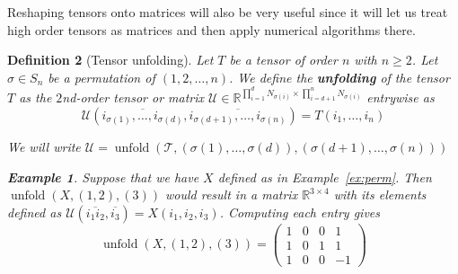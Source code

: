 \documentclass[11pt,a4paper,openright,oneside]{book}
\numberwithin{equation}{section}
\newtheorem{defn0}{Definition}[chapter]
\newtheorem{example0}[defn0]{Example}
\newenvironment{definition}{ \begin{defn0}}{\end{defn0}}
\newenvironment{example}{ \begin{example0}\rm}{\end{example0}}
\newcommand{\exref}[1]{Example~\ref{#1}}
\DeclareMathOperator{\unfolding}{unfold}
\begin{document}
Reshaping tensors onto matrices will also be very useful since it will let us treat high order tensors as matrices and then apply numerical algorithms
there.

\begin{definition}[Tensor unfolding]
Let $T$ be a tensor of order $n$ with $n \geqslant 2$. Let $\sigma \in S_n$ be a permutation of $(1,2,\dots, n)$. We define the
\textbf{unfolding} of the tensor $T$ as the $2$nd-order tensor or matrix 
$\mathcal{U} \in \mathbb{R}^{\prod_{i=1}^d N_{\sigma(i)} \times \prod_{i=d+1}^n N_{\sigma(i)}}$ entrywise as
$$ \mathcal{U} (\overline{i_{\sigma(1)}, \dots, i_{\sigma(d)}}, \overline{i_{\sigma(d+1)}, \dots, i_{\sigma(n)}}) = T(i_1, \dots, i_n)$$

We will write $\mathcal{U} = \unfolding{(\mathcal{T}, (\sigma(1), \dots, \sigma(d)), (\sigma(d+1), \dots, \sigma(n)))}$ 

\begin{example}
    Suppose that we have $X$ defined as in \exref{ex:perm}.
        Then $\unfolding{(X, (1, 2), (3))}$ would result in a matrix $\mathbb{R}^{3 \times 4}$ with its elements defined as 
        $\mathcal{U}(\overline{i_1  i_2}, \overline{i_3}) = X(i_1, i_2, i_3)$. Computing each entry gives
        $$\unfolding{(X, (1, 2), (3))} = \begin{pmatrix}
            1 & 0 & 0 & 1 \\
            1 & 0 & 1 & 1 \\
            1 & 0 & 0 & -1
        \end{pmatrix}
        $$
    \label{exa:unfold}
\end{example}


\end{definition}
\end{document}

